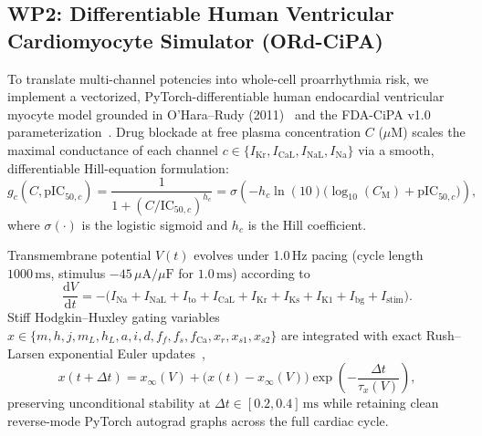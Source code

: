 \documentclass[10pt,twocolumn,letterpaper]{article}
\begin{document}
\subsection{WP2: Differentiable Human Ventricular Cardiomyocyte Simulator (ORd-CiPA)}
\label{sec:wp2}

To translate multi-channel potencies into whole-cell proarrhythmia risk, we implement a vectorized, PyTorch-differentiable human endocardial ventricular myocyte model grounded in O'Hara--Rudy (2011)~\cite{ohara2011simulation} and the FDA-CiPA v1.0 parameterization~\cite{dutta2017optimization,li2019assessment}. Drug blockade at free plasma concentration $C$ ($\mu\mathrm{M}$) scales the maximal conductance of each channel $c \in \{I_{\mathrm{Kr}}, I_{\mathrm{CaL}}, I_{\mathrm{NaL}}, I_{\mathrm{Na}}\}$ via a smooth, differentiable Hill-equation formulation:
\begin{equation}
  g_c(C, \mathrm{pIC}_{50,c}) = \frac{1}{1 + (C / \mathrm{IC}_{50,c})^{h_c}}
  = \sigma\!\left(-h_c \ln(10)\bigl(\log_{10}(C_{\mathrm{M}}) + \mathrm{pIC}_{50,c}\bigr)\right),
  \label{eq:hill}
\end{equation}
where $\sigma(\cdot)$ is the logistic sigmoid and $h_c$ is the Hill coefficient.

Transmembrane potential $V(t)$ evolves under 1.0\,Hz pacing (cycle length $1000\,\mathrm{ms}$, stimulus $-45\,\mu\mathrm{A}/\mu\mathrm{F}$ for $1.0\,\mathrm{ms}$) according to
\begin{equation}
  \frac{\mathrm{d}V}{\mathrm{d}t} = -\bigl(I_{\mathrm{Na}} + I_{\mathrm{NaL}} + I_{\mathrm{to}} + I_{\mathrm{CaL}} + I_{\mathrm{Kr}} + I_{\mathrm{Ks}} + I_{\mathrm{K1}} + I_{\mathrm{bg}} + I_{\mathrm{stim}}\bigr).
  \label{eq:dvdt}
\end{equation}
Stiff Hodgkin--Huxley gating variables $x \in \{m, h, j, m_L, h_L, a, i, d, f_f, f_s, f_{\mathrm{Ca}}, x_r, x_{s1}, x_{s2}\}$ are integrated with exact Rush--Larsen exponential Euler updates~\cite{rush1978practical},
\begin{equation}
  x(t + \Delta t) = x_\infty(V) + \bigl(x(t) - x_\infty(V)\bigr)\exp\!\left(-\frac{\Delta t}{\tau_x(V)}\right),
  \label{eq:rush_larsen}
\end{equation}
preserving unconditional stability at $\Delta t \in [0.2, 0.4]\,\mathrm{ms}$ while retaining clean reverse-mode PyTorch autograd graphs across the full cardiac cycle.
\end{document}
